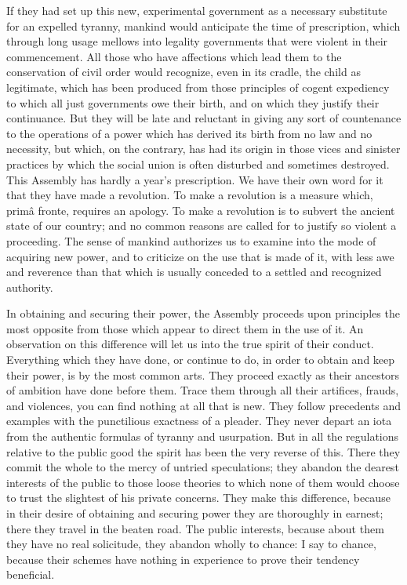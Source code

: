 If they had set up this new, experimental government as a necessary substitute for an expelled tyranny, mankind would anticipate the time of prescription, which through long usage mellows into legality governments that were violent in their commencement. All those who have affections which lead them to the conservation of civil order would recognize, even in its cradle, the child as legitimate, which has been produced from those principles of cogent expediency to which all just governments owe their birth, and on which they justify their continuance. But they will be late and reluctant in giving any sort of countenance to the operations of a power which has derived its birth from no law and no necessity, but which, on the contrary, has had its origin in those vices and sinister practices by which the social union is often disturbed and sometimes destroyed. This Assembly has hardly a year's prescription. We have their own word for it that they have made a revolution. To make a revolution is a measure which, primâ fronte, requires an apology. To make a revolution is to subvert the ancient state of our country; and no common reasons are called for to justify so violent a proceeding. The sense of mankind authorizes us to examine into the mode of acquiring new power, and to criticize on the use that is made of it, with less awe and reverence than that which is usually conceded to a settled and recognized authority.

In obtaining and securing their power, the Assembly proceeds upon principles the most opposite from those which appear to direct them in the use of it. An observation on this difference will let us into the true spirit of their conduct. Everything which they have done, or continue to do, in order to obtain and keep their power, is by the most common arts. They proceed exactly as their ancestors of ambition have done before them. Trace them through all their artifices, frauds, and violences, you can find nothing at all that is new. They follow precedents and examples with the punctilious exactness of a pleader. They never depart an iota from the authentic formulas of tyranny and usurpation. But in all the regulations relative to the public good the spirit has been the very reverse of this. There they commit the whole to the mercy of untried speculations; they abandon the dearest interests of the public to those loose theories to which none of them would choose to trust the slightest of his private concerns. They make this difference, because in their desire of obtaining and securing power they are thoroughly in earnest; there they travel in the beaten road. The public interests, because about them they have no real solicitude, they abandon wholly to chance: I say to chance, because their schemes have nothing in experience to prove their tendency beneficial.

